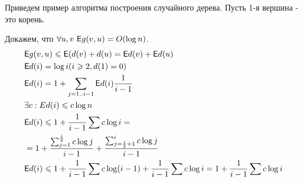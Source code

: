 \begin{example}
    Приведем пример алгоритма построения случайного дерева. Пусть 1-я вершина - это корень. \par

\rm{
  \begin{algorithm}
    \begin{algorithmic}
        \EndIf
      \EndFor
    \end{algorithmic}
  \end{algorithm}
}
    Докажем, что $\forall u,v \ \mathsf{E} g(v,u)=O(\log n)$.
    \begin{align*}
        & \mathsf{E} g(v,u) \leqslant \mathsf{E}(d(v) + d(u) = \mathsf{E} d(v) + \mathsf{E} d(u) \\
        & \mathsf{E} d(i)=\log i (i \geqslant{2},d(1)=0) \\
        & \mathsf{E} d(i)=1+\sum_{j=1..i-1} \mathsf{E} d(i) \frac{1}{i-1} \\
        & \exists c: Ed(i) \leqslant{c \log n} \\
        & \mathsf{E} d(i) \leqslant{ 1+ \frac{1}{i-1} \sum c \log i} = \\
        & = 1 + \frac{\sum_{j=1}^{\frac{i}{2}} c \log j}{i-1} + \frac{\sum_{j=\frac{i}{2}+1}^{i} c \log j}{i-1} \\
        & \mathsf{E} d(i) \leqslant{1+\frac{1}{i-1} \sum c\log (i-1) + \frac{1}{i-1} \sum c\log i} = 1 + \frac{1}{i-1} \sum c\log i
    \end{align*}
\end{example}